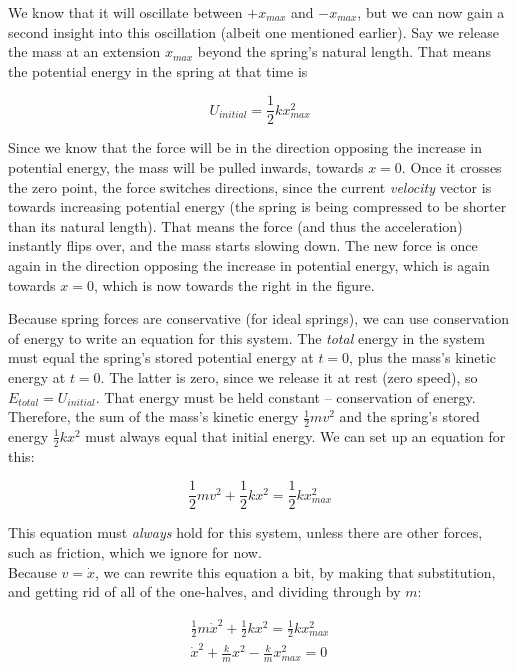 \documentclass[12pt,a4paper]{report}
\begin{document}
We know that it will oscillate between $+x_{max}$ and $-x_{max}$, but we can now gain a second insight into this oscillation (albeit one mentioned earlier). Say we release the mass at an extension $x_{max}$ beyond the spring's natural length. That means the potential energy in the spring at that time is

\begin{equation}
U_{initial} = \frac{1}{2} k x_{max}^2
\end{equation}

Since we know that the force will be in the direction opposing the increase in potential energy, the mass will be pulled inwards, towards $x = 0$. Once it crosses the zero point, the force switches directions, since the current \emph{velocity} vector is towards increasing potential energy (the spring is being compressed to be shorter than its natural length). That means the force (and thus the acceleration) instantly flips over, and the mass starts slowing down. The new force is once again in the direction opposing the increase in potential energy, which is again towards $x = 0$, which is now towards the right in the figure.

Because spring forces are conservative (for ideal springs), we can use conservation of energy to write an equation for this system. The \emph{total} energy in the system must equal the spring's stored potential energy at $t = 0$, plus the mass's kinetic energy at $t = 0$. The latter is zero, since we release it at rest (zero speed), so $E_{total} = U_{initial}$. That energy must be held constant -- conservation of energy. Therefore, the sum of the mass's kinetic energy $\displaystyle \frac{1}{2} m v^2$ and the spring's stored energy $\displaystyle \frac{1}{2} k x^2$ must always equal that initial energy. We can set up an equation for this:

\begin{equation}
\frac{1}{2} m v^2 + \frac{1}{2} k x^2 = \frac{1}{2} k x_{max}^2
\end{equation}

This equation must \emph{always} hold for this system, unless there are other forces, such as friction, which we ignore for now.\\
Because $v = \dot{x}$, we can rewrite this equation a bit, by making that substitution, and getting rid of all of the one-halves, and dividing through by $m$:

\begin{align}
\frac{1}{2} m \dot{x}^2 + \frac{1}{2} k x^2 = \frac{1}{2} k x_{max}^2\\
\dot{x}^2 + \frac{k}{m} x^2 - \frac{k}{m} x_{max}^2 = 0
\end{align}
\end{document}
